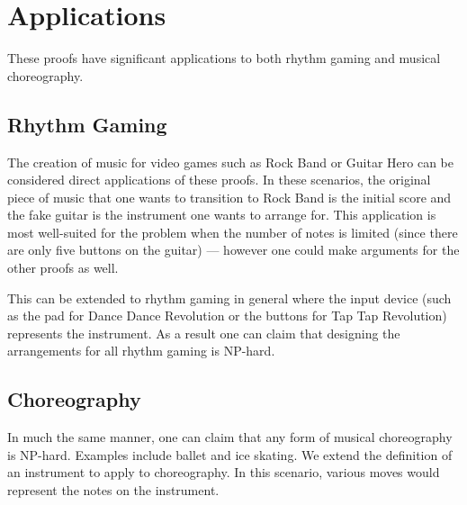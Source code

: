 \documentclass[11pt,letterpaper]{article}
\begin{document}
\section{Applications}
These proofs have significant applications to both rhythm gaming and musical choreography.
\subsection{Rhythm Gaming}
The creation of music for video games such as Rock Band or Guitar Hero can be considered direct applications of these proofs. In these scenarios, the original piece of music that one wants to transition to Rock Band is the initial score and the fake guitar is the instrument one wants to arrange for. This application is most well-suited for the problem when the number of notes is limited (since there are only five buttons on the guitar) --- however one could make arguments for the other proofs as well.

This can be extended to rhythm gaming in general where the input device (such as the pad for Dance Dance Revolution or the buttons for Tap Tap Revolution) represents the instrument. As a result one can claim that designing the arrangements for all rhythm gaming is NP-hard.

\subsection{Choreography}
In much the same manner, one can claim that any form of musical choreography is NP-hard. Examples include ballet and ice skating. We extend the definition of an instrument to apply to choreography. In this scenario, various moves would represent the notes on the instrument.

{}

\end{document}
